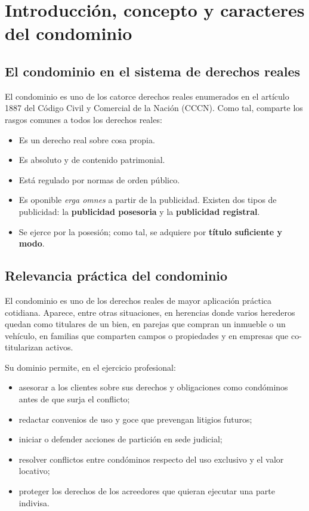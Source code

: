 \documentclass[12pt,oneside]{book}
\begin{document}

\chapter[Concepto y caracteres del condominio]{Introducción, concepto y caracteres del condominio}

\section{El condominio en el sistema de derechos reales}

El condominio es uno de los catorce derechos reales enumerados en el artículo 1887 del Código Civil y Comercial de la Nación (CCCN). Como tal, comparte los rasgos comunes a todos los derechos reales:

\begin{itemize}
    \item Es un derecho real sobre cosa propia.
    \item Es absoluto y de contenido patrimonial.
    \item Está regulado por normas de orden público.
    \item Es oponible \textit{erga omnes} a partir de la publicidad. Existen dos tipos de publicidad: la \textbf{publicidad posesoria} y la \textbf{publicidad registral}.
    \item Se ejerce por la posesión; como tal, se adquiere por \textbf{título suficiente y modo}.
\end{itemize}

\section{Relevancia práctica del condominio}

El condominio es uno de los derechos reales de mayor aplicación práctica cotidiana. Aparece, entre otras situaciones, en herencias donde varios herederos quedan como titulares de un bien, en parejas que compran un inmueble o un vehículo, en familias que comparten campos o propiedades y en empresas que co-titularizan activos.

Su dominio permite, en el ejercicio profesional:

\begin{itemize}
    \item asesorar a los clientes sobre sus derechos y obligaciones como condóminos antes de que surja el conflicto;
    \item redactar convenios de uso y goce que prevengan litigios futuros;
    \item iniciar o defender acciones de partición en sede judicial;
    \item resolver conflictos entre condóminos respecto del uso exclusivo y el valor locativo;
    \item proteger los derechos de los acreedores que quieran ejecutar una parte indivisa.
\end{itemize}
\end{document}
